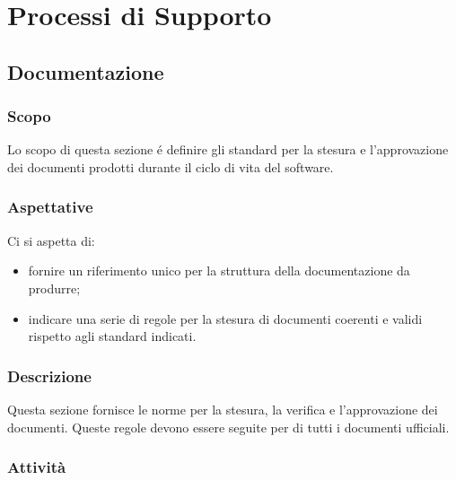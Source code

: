 \section{Processi di Supporto}
  \subsection{Documentazione}
  \subsubsection{Scopo}
  Lo scopo di questa sezione é definire gli standard per la stesura e l'approvazione dei documenti prodotti durante il ciclo di vita del software.

  \subsubsection{Aspettative}
  Ci si aspetta di:
  \begin{itemize}
    \item fornire un riferimento unico per la struttura  della documentazione da produrre;
    \item indicare una serie di regole per la stesura di documenti coerenti e validi rispetto agli standard indicati.
  \end{itemize}

  \subsubsection{Descrizione}
  Questa sezione fornisce le norme per la stesura, la verifica e l'approvazione dei documenti. Queste regole devono essere seguite per di tutti i documenti ufficiali.

  \subsubsection{Attività}
